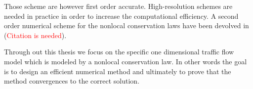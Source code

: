 Those scheme are however first order accurate. High-resolution schemes are needed in practice in order to increase the computational efficiency. A second order numerical scheme for the nonlocal conservation laws have been devolved in  (\textcolor{red}{Citation is needed}).







Through out this thesis we focus on the specific one dimensional traffic flow model which is
modeled by a nonlocal conservation law. In other words the goal is to design an efficient numerical method and ultimately to prove that the method convergences to the correct solution.